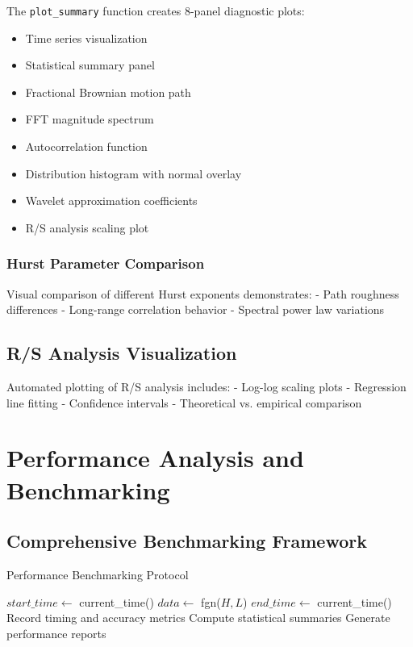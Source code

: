 \documentclass[11pt,a4paper]{article}
\begin{document}
The \texttt{plot\_summary} function creates 8-panel diagnostic plots:
\begin{itemize}
    \item Time series visualization
    \item Statistical summary panel
    \item Fractional Brownian motion path
    \item FFT magnitude spectrum
    \item Autocorrelation function
    \item Distribution histogram with normal overlay
    \item Wavelet approximation coefficients
    \item R/S analysis scaling plot
\end{itemize}

\subsubsection{Hurst Parameter Comparison}

Visual comparison of different Hurst exponents demonstrates:
- Path roughness differences
- Long-range correlation behavior
- Spectral power law variations

\subsection{R/S Analysis Visualization}

Automated plotting of R/S analysis includes:
- Log-log scaling plots
- Regression line fitting
- Confidence intervals
- Theoretical vs. empirical comparison

\section{Performance Analysis and Benchmarking}

\subsection{Comprehensive Benchmarking Framework}

\begin{algorithm}
\caption{Performance Benchmarking Protocol}
\begin{algorithmic}[1]
                \State $start\_time \gets$ current\_time()
                \State $data \gets$ fgn($H, L$)
                \State $end\_time \gets$ current\_time()
                \State Record timing and accuracy metrics
            \EndFor
        \EndFor
    \EndFor
    \State Compute statistical summaries
    \State Generate performance reports
\EndProcedure
\end{algorithmic}
\end{algorithm}
\end{document}
